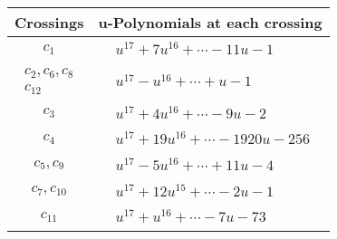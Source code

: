 \documentclass[1p]{elsarticle_modified}
\theoremstyle{definition}
\begin{document}
\begin{tabular}{m{50pt}|m{274pt}}
Crossings & \hspace{64pt}u-Polynomials at each crossing \\
\hline $$\begin{aligned}c_{1}\end{aligned}$$&$\begin{aligned}
&u^{17}+7 u^{16}+\cdots-11 u-1
\end{aligned}$\\
\hline $$\begin{aligned}c_{2},c_{6},c_{8}\\c_{12}\end{aligned}$$&$\begin{aligned}
&u^{17}- u^{16}+\cdots+u-1
\end{aligned}$\\
\hline $$\begin{aligned}c_{3}\end{aligned}$$&$\begin{aligned}
&u^{17}+4 u^{16}+\cdots-9 u-2
\end{aligned}$\\
\hline $$\begin{aligned}c_{4}\end{aligned}$$&$\begin{aligned}
&u^{17}+19 u^{16}+\cdots-1920 u-256
\end{aligned}$\\
\hline $$\begin{aligned}c_{5},c_{9}\end{aligned}$$&$\begin{aligned}
&u^{17}-5 u^{16}+\cdots+11 u-4
\end{aligned}$\\
\hline $$\begin{aligned}c_{7},c_{10}\end{aligned}$$&$\begin{aligned}
&u^{17}+12 u^{15}+\cdots-2 u-1
\end{aligned}$\\
\hline $$\begin{aligned}c_{11}\end{aligned}$$&$\begin{aligned}
&u^{17}+u^{16}+\cdots-7 u-73
\end{aligned}$\\
\hline
\end{tabular}\\~\\
\end{document}
